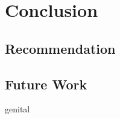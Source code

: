 \documentclass[ExampleMasters.tex]{subfiles}
\begin{document}
\chapter{Conclusion}


\section{Recommendation}

\section{Future Work}



genital\cite{paper:A}
\end{document}
